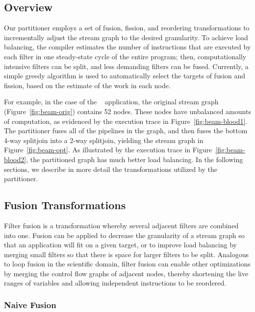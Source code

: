 \subsection{Overview}

Our partitioner employs a set of fusion, fission, and reordering
transformations to incrementally adjust the stream graph to the
desired granularity.  To achieve load balancing, the compiler
estimates the number of instructions that are executed by each filter
in one steady-state cycle of the entire program; then, computationally
intensive filters can be split, and less demanding filters can be
fused.  Currently, a simple greedy algorithm is used to automatically
select the targets of fusion and fission, based on the estimate of the
work in each node.

For example, in the case of the \Radar~ application, the original
stream graph (Figure~\ref{fig:beam-orig}) contains 52 nodes.  These
nodes have unbalanced amounts of computation, as evidenced by the
execution trace in Figure~\ref{fig:beam-blood1}.  The partitioner
fuses all of the pipelines in the graph, and then fuses the bottom
4-way splitjoin into a 2-way splitjoin, yielding the stream graph in
Figure~\ref{fig:beam-opt}.  As illustrated by the execution trace in
Figure~\ref{fig:beam-blood2}, the partitioned graph has much better
load balancing.  In the following sections, we describe in more detail
the transformations utilized by the partitioner.

\subsection{Fusion Transformations}

Filter fusion is a transformation whereby several adjacent filters are
combined into one.  Fusion can be applied to decrease the granularity
of a stream graph so that an application will fit on a given target,
or to improve load balancing by merging small filters so that there is
space for larger filters to be split.  Analogous to loop fusion in the
scientific domain, filter fusion can enable other optimizations by
merging the control flow graphs of adjacent nodes, thereby shortening
the live ranges of variables and allowing independent instructions to
be reordered.

\subsubsection{Naive Fusion}

